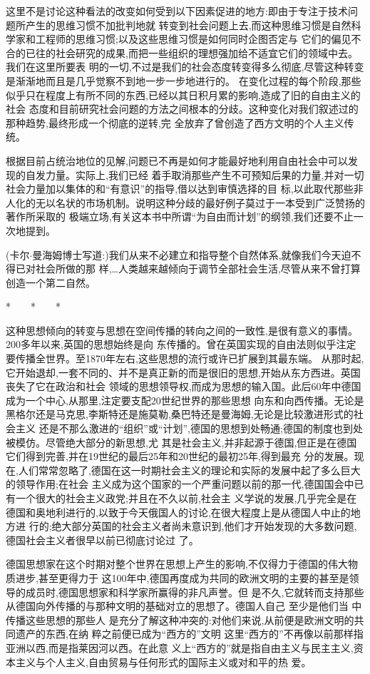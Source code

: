 ﻿\documentclass[12pt]{article}
\begin{document}
这里不是讨论这种看法的改变如何受到以下因素促进的地方:即由于专注于技术问题所产生的思维习惯不加批判地就
转变到社会问题上去,而这种思维习惯是自然科学家和工程师的思维习惯;以及这些思维习惯是如何同时企图否定与
它们的偏见不合的已往的社会研究的成果,而把一些组织的理想强加给不适宜它们的领域中去。 我们在这里所要表
明的一切,不过是我们的社会态度转变得多么彻底,尽管这种转变是渐渐地而且是几乎觉察不到地一步一步地进行的。
在变化过程的每个阶段,那些似乎只在程度上有所不同的东西,已经以其日积月累的影响,造成了旧的自由主义的社会
态度和目前研究社会问题的方法之间根本的分歧。这种变化对我们叙述过的那种趋势,最终形成一个彻底的逆转,完
全放弃了曾创造了西方文明的个人主义传统。

根据目前占统治地位的见解,问题已不再是如何才能最好地利用自由社会中可以发现的自发力量。实际上,我们已经
着手取消那些产生不可预知后果的力量,并对一切社会力量加以集体的和``有意识''的指导,借以达到审慎选择的目
标,以此取代那些非人化的无以名状的市场机制。说明这种分歧的最好例子莫过于一本受到广泛赞扬的著作所采取的
极端立场,有关这本书中所谓``为自由而计划''的纲领,我们还要不止一次地提到。

(卡尔$\cdot$曼海姆博士写道:)我们从来不必建立和指导整个自然体系,就像我们今天迫不得已对社会所做的那
样,\ldots 人类越来越倾向于调节全部社会生活,尽管从来不曾打算创造一个第二自然。

*　　*　　*

这种思想倾向的转变与思想在空间传播的转向之间的一致性,是很有意义的事情。200多年以来,英国的思想始终是向
东传播的。曾在英国实现的自由法则似乎注定要传播全世界。至1870年左右,这些思想的流行或许已扩展到其最东端。
从那时起,它开始退却,一套不同的、并不是真正新的而是很旧的思想,开始从东方西进。英国丧失了它在政治和社会
领域的思想领导权,而成为思想的输入国。此后60年中德国成为一个中心,从那里,注定要支配20世纪世界的那些思想
向东和向西传播。无论是黑格尔还是马克思,李斯特还是施莫勒,桑巴特还是曼海姆,无论是比较激进形式的社会主义
还是不那么激进的``组织''或``计划'',德国的思想到处畅通;德国的制度也到处被模仿。尽管绝大部分的新思想,尤
其是社会主义,并非起源于德国,但正是在德国它们得到完善,并在19世纪的最后25年和20世纪的最初25年,得到最充
分的发展。现在,人们常常忽略了,德国在这一时期社会主义的理论和实际的发展中起了多么巨大的领导作用;在社会
主义成为这个国家的一个严重问题以前的那一代,德国国会中已有一个很大的社会主义政党;并且在不久以前,社会主
义学说的发展,几乎完全是在德国和奥地利进行的,以致于今天俄国人的讨论,在很大程度上是从德国人中止的地方进
行的;绝大部分英国的社会主义者尚未意识到,他们才开始发现的大多数问题,德国社会主义者很早以前已彻底讨论过
了。

德国思想家在这个时期对整个世界在思想上产生的影响,不仅得力于德国的伟大物质进步,甚至更得力于
这100年中,德国再度成为共同的欧洲文明的主要的甚至是领导的成员时,德国思想家和科学家所赢得的非凡声誉。但
是不久,它就转而支持那些从德国向外传播的与那种文明的基础对立的思想了。德国人自己 \myrule 至少是他们当
中传播这些思想的那些人 \myrule 是充分了解这种冲突的:对他们来说,从前便是欧洲文明的共同遗产的东西,在纳
粹之前便已成为``西方的''文明 \myrule 这里``西方的''不再像以前那样指亚洲以西,而是指莱因河以西。在此意
义上``西方的''就是指自由主义与民主主义,资本主义与个人主义,自由贸易与任何形式的国际主义或对和平的热
爱。
\end{document}
